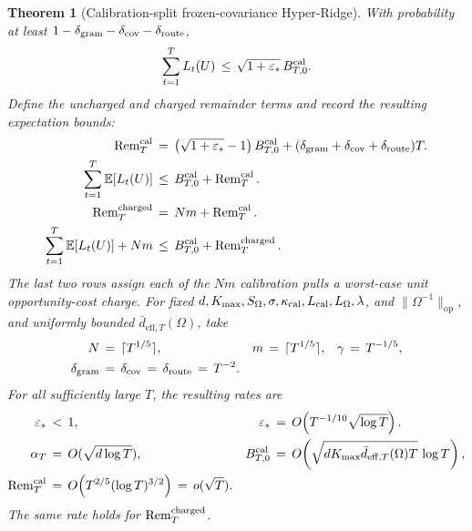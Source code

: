 \documentclass{article} %
\newtheorem{theorem}{Theorem}
\begin{document}
\begin{theorem}[Calibration-split frozen-covariance Hyper-Ridge]
With probability at least
\(1-\delta_{\rm gram}-\delta_{\rm cov}-\delta_{\rm route}\),
\begin{equation}
\sum_{t=1}^T L_t(U)
\,\leq\,
\sqrt{1+\varepsilon_*}\,B_{T,0}^{\rm cal}.
\end{equation}
Define the uncharged and charged remainder terms and record the resulting
expectation bounds:
\begin{equation}
\begin{aligned}
\operatorname{Rem}_T^{\rm cal}
&\,=\,
\left(\sqrt{1+\varepsilon_*}-1\right)B_{T,0}^{\rm cal}
+
(\delta_{\rm gram}+\delta_{\rm cov}+\delta_{\rm route})T.
\\
\sum_{t=1}^T\mathbb{E}[L_t(U)]
&\,\leq\,
B_{T,0}^{\rm cal}
+
\operatorname{Rem}_T^{\rm cal}.
\\
\operatorname{Rem}_T^{\rm charged}
&\,=\,
Nm+\operatorname{Rem}_T^{\rm cal}.
\\
\sum_{t=1}^T\mathbb E[L_t(U)]+Nm
&\,\leq\,
B_{T,0}^{\rm cal}
+
\operatorname{Rem}_T^{\rm charged}.
\end{aligned}
\end{equation}
The last two rows assign each of the \(Nm\) calibration pulls a worst-case unit
opportunity-cost charge. For fixed
\(d,K_{\max},S_\Omega,\sigma,\kappa_{\rm cal},L_{\rm cal},L_\Omega,\lambda\),
and \(\|\Omega^{-1}\|_{\mathrm{op}}\), and uniformly bounded
\(\bar d_{\mathrm{eff},T}(\Omega)\), take
\begin{equation}
\begin{aligned}
N
&\,=\,
\lceil T^{1/5}\rceil,
&
m
&\,=\,
\lceil T^{1/5}\rceil,
&
\gamma
&\,=\,
T^{-1/5},
\\
\delta_{\rm gram}
&\,=\,
\delta_{\rm cov}
\,=\,
\delta_{\rm route}
\,=\,
T^{-2}.
\end{aligned}
\end{equation}
For all sufficiently large \(T\), the resulting rates are
\begin{equation}
\begin{aligned}
\varepsilon_*
&\,<\,
1,
&
\varepsilon_*
&\,=\,
O\!\left(T^{-1/10}\sqrt{\log T}\right).
\\
\alpha_T
&\,=\,
O(\sqrt{d\log T}),
&
B_{T,0}^{\rm cal}
&\,=\,
O\!\left(
\sqrt{dK_{\max}\bar d_{\mathrm{eff},T}(\Omega)T}\,\log T
\right),
\\
\operatorname{Rem}_T^{\rm cal}
&\,=\,
O\!\left(T^{2/5}(\log T)^{3/2}\right)
\,=\,
o(\sqrt{T}).
\end{aligned}
\end{equation}
The same rate holds for
\(\operatorname{Rem}_T^{\rm charged}\).
\end{theorem}
\end{document}
